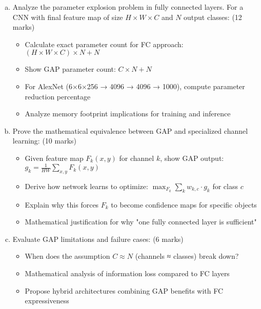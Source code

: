 \documentclass[12pt]{article}
\newcommand{\shortanswer}{\vspace{2cm}}
\newcommand{\mediumanswer}{\vspace{3cm}}
\newcommand{\journalspace}{\vspace{4.5cm}}
\begin{document}
\begin{enumerate}[(a)]
    \item Analyze the parameter explosion problem in fully connected layers. For a CNN with final feature map of size $H \times W \times C$ and $N$ output classes: \hfill (12 marks)
    \begin{itemize}
        \item Calculate exact parameter count for FC approach: $(H \times W \times C) \times N + N$
        \item Show GAP parameter count: $C \times N + N$
        \item For AlexNet (6×6×256 → 4096 → 4096 → 1000), compute parameter reduction percentage
        \item Analyze memory footprint implications for training and inference
    \end{itemize}
    
    \journalspace
    
    \item Prove the mathematical equivalence between GAP and specialized channel learning: \hfill (10 marks)
    \begin{itemize}
        \item Given feature map $F_k(x,y)$ for channel $k$, show GAP output: $g_k = \frac{1}{HW}\sum_{x,y} F_k(x,y)$
        \item Derive how network learns to optimize: $\max_{F_k} \sum_k w_{k,c} \cdot g_k$ for class $c$
        \item Explain why this forces $F_k$ to become confidence maps for specific objects
        \item Mathematical justification for why "one fully connected layer is sufficient"
    \end{itemize}
    
    \mediumanswer
    
    \item Evaluate GAP limitations and failure cases: \hfill (6 marks)
    \begin{itemize}
        \item When does the assumption $C \approx N$ (channels ≈ classes) break down?
        \item Mathematical analysis of information loss compared to FC layers
        \item Propose hybrid architectures combining GAP benefits with FC expressiveness
    \end{itemize}
    
    \shortanswer
\end{enumerate}
\end{document}
